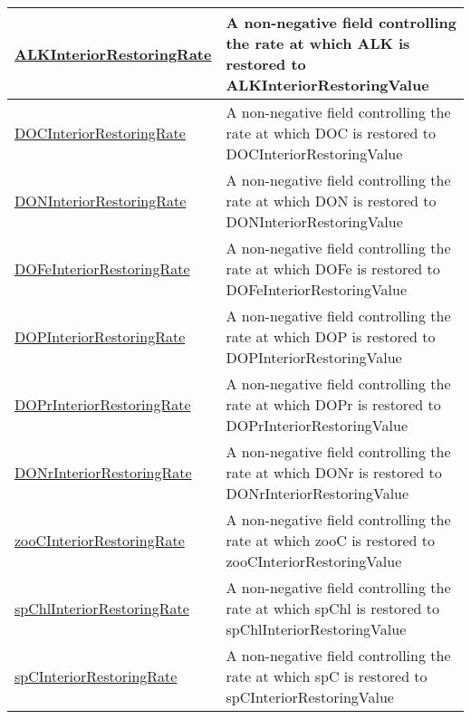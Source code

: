 {\begin{center}
\begin{longtable}{| p{2.0in} | p{4.0in} |}
    \hline
    \hyperref[subsec:var_sec_tracersInteriorRestoringFields_ALKInteriorRestoringRate]{ALKInteriorRestoringRate} & A non-negative field controlling the rate at which ALK is restored to ALKInteriorRestoringValue \\
    \hline
    \hyperref[subsec:var_sec_tracersInteriorRestoringFields_DOCInteriorRestoringRate]{DOCInteriorRestoringRate} & A non-negative field controlling the rate at which DOC is restored to DOCInteriorRestoringValue \\
    \hline
    \hyperref[subsec:var_sec_tracersInteriorRestoringFields_DONInteriorRestoringRate]{DONInteriorRestoringRate} & A non-negative field controlling the rate at which DON is restored to DONInteriorRestoringValue \\
    \hline
    \hyperref[subsec:var_sec_tracersInteriorRestoringFields_DOFeInteriorRestoringRate]{DOFeInteriorRestoringRate} & A non-negative field controlling the rate at which DOFe is restored to DOFeInteriorRestoringValue \\
    \hline
    \hyperref[subsec:var_sec_tracersInteriorRestoringFields_DOPInteriorRestoringRate]{DOPInteriorRestoringRate} & A non-negative field controlling the rate at which DOP is restored to DOPInteriorRestoringValue \\
    \hline
    \hyperref[subsec:var_sec_tracersInteriorRestoringFields_DOPrInteriorRestoringRate]{DOPrInteriorRestoringRate} & A non-negative field controlling the rate at which DOPr is restored to DOPrInteriorRestoringValue \\
    \hline
    \hyperref[subsec:var_sec_tracersInteriorRestoringFields_DONrInteriorRestoringRate]{DONrInteriorRestoringRate} & A non-negative field controlling the rate at which DONr is restored to DONrInteriorRestoringValue \\
    \hline
    \hyperref[subsec:var_sec_tracersInteriorRestoringFields_zooCInteriorRestoringRate]{zooCInteriorRestoringRate} & A non-negative field controlling the rate at which zooC is restored to zooCInteriorRestoringValue \\
    \hline
    \hyperref[subsec:var_sec_tracersInteriorRestoringFields_spChlInteriorRestoringRate]{spChlInteriorRestoringRate} & A non-negative field controlling the rate at which spChl is restored to spChlInteriorRestoringValue \\
    \hline
    \hyperref[subsec:var_sec_tracersInteriorRestoringFields_spCInteriorRestoringRate]{spCInteriorRestoringRate} & A non-negative field controlling the rate at which spC is restored to spCInteriorRestoringValue \\

\end{longtable}
\end{center}}
